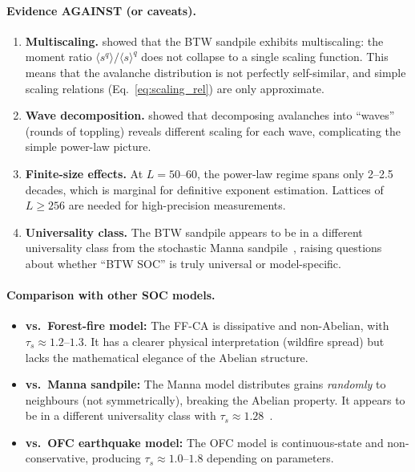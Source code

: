 \documentclass[preprint,12pt]{elsarticle}
\begin{document}
\paragraph{Evidence AGAINST (or caveats).}
\begin{enumerate}
  \item \textbf{Multiscaling.}
        \citet{DeMenech1998} showed that the BTW sandpile exhibits
        multiscaling: the moment ratio $\langle s^q\rangle / \langle s\rangle^q$
        does not collapse to a single scaling function.
        This means that the avalanche distribution is not perfectly
        self-similar, and simple scaling relations (Eq.~\ref{eq:scaling_rel})
        are only approximate.
  \item \textbf{Wave decomposition.}
        \citet{Ktitarev2000} showed that decomposing avalanches into
        ``waves'' (rounds of toppling) reveals different scaling for
        each wave, complicating the simple power-law picture.
  \item \textbf{Finite-size effects.}
        At $L=50$--$60$, the power-law regime spans only 2--2.5 decades,
        which is marginal for definitive exponent estimation.
        Lattices of $L\ge256$ are needed for high-precision
        measurements.
  \item \textbf{Universality class.}
        The BTW sandpile appears to be in a different universality class
        from the stochastic Manna sandpile~\cite{Manna1991,Lubeck2004},
        raising questions about whether ``BTW SOC'' is truly
        universal or model-specific.
\end{enumerate}

\paragraph{Comparison with other SOC models.}
\begin{itemize}[leftmargin=2em]
  \item \textbf{vs.\ Forest-fire model:} The FF-CA is dissipative
        and non-Abelian, with $\tau_s\approx1.2$--$1.3$.
        It has a clearer physical interpretation (wildfire spread)
        but lacks the mathematical elegance of the Abelian structure.
  \item \textbf{vs.\ Manna sandpile:} The Manna model distributes
        grains \emph{randomly} to neighbours (not symmetrically),
        breaking the Abelian property.
        It appears to be in a different universality class
        with $\tau_s\approx1.28$~\cite{Lubeck2004}.
  \item \textbf{vs.\ OFC earthquake model:} The OFC model is
        continuous-state and non-conservative, producing
        $\tau_s\approx1.0$--$1.8$ depending on parameters.
\end{itemize}
\end{document}
